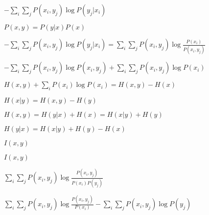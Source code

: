 \documentclass{article}
\def\lthtmlcheckvsize{\ifdim\ht\sizebox<\vsize 
  \ifdim\wd\sizebox<\hsize\expandafter\hfill\fi \expandafter\vfill
  \else\expandafter\vss\fi}%
\begin{document}
{\newpage\clearpage
{}%
$\displaystyle -\sum_i \sum_j P(x_i,y_j) \log P(y_j|x_i)$%
\lthtmlindisplaymathZ
\lthtmlcheckvsize\clearpage}

{\newpage\clearpage
{}%
$ P(x,y)=P(y|x) P(x)$%
\lthtmlindisplaymathZ
\lthtmlcheckvsize\clearpage}

{\newpage\clearpage
{}%
$\displaystyle -\sum_i \sum_j P(x_i,y_j) \log P(y_j|x_i)
=\sum_i \sum_j P(x_i,y_j) \log \frac{P(x_i)}{P(x_i,y_j)}$%
\lthtmlindisplaymathZ
\lthtmlcheckvsize\clearpage}

{\newpage\clearpage
{}%
$\displaystyle -\sum_i\sum_j P(x_i,y_j)\log P(x_i,y_j)+\sum_i\sum_j P(x_i,y_j) \log P(x_i)$%
\lthtmlindisplaymathZ
\lthtmlcheckvsize\clearpage}

{\newpage\clearpage
{}%
$\displaystyle H(x,y)+\sum_iP(x_i) \log P(x_i)=H(x,y)-H(x)$%
\lthtmlindisplaymathZ
\lthtmlcheckvsize\clearpage}

{\newpage\clearpage
{}%
$ H(x|y)=H(x,y)-H(y)$%
\lthtmlindisplaymathZ
\lthtmlcheckvsize\clearpage}

{\newpage\clearpage
{}%
$\displaystyle H(x,y)=H(y|x)+H(x)=H(x|y)+H(y)$%
\lthtmlindisplaymathZ
\lthtmlcheckvsize\clearpage}

{\newpage\clearpage
{}%
$\displaystyle H(y|x)=H(x|y)+H(y)-H(x)$%
\lthtmlindisplaymathZ
\lthtmlcheckvsize\clearpage}

{\newpage\clearpage
{}%
$ I(x,y)$%
\lthtmlindisplaymathZ
\lthtmlcheckvsize\clearpage}

{\newpage\clearpage
{}%
$\displaystyle I(x,y)$%
\lthtmlindisplaymathZ
\lthtmlcheckvsize\clearpage}

{\newpage\clearpage
{}%
$\displaystyle \sum_i\sum_j P(x_i,y_j)\log\frac{P(x_i,y_j)}{P(x_i)P(y_j)}$%
\lthtmlindisplaymathZ
\lthtmlcheckvsize\clearpage}

{\newpage\clearpage
{}%
$\displaystyle \sum_i\sum_j P(x_i,y_j)\log\frac{P(x_i,y_j)}{P(x_i)}
-\sum_i\sum_j P(x_i,y_j)\log P(y_j)$%
\lthtmlindisplaymathZ
\lthtmlcheckvsize\clearpage}
\end{document}
